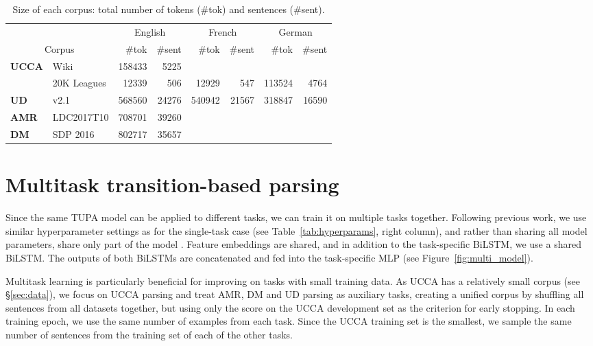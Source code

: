 \documentclass[11pt,a4paper]{article}
\begin{document}
\begin{table*}[ht]
\centering
\begin{tabular}{ll|rr|rr|rr}
& & \multicolumn{2}{c|}{\footnotesize English} & \multicolumn{2}{c|}{\footnotesize French} & \multicolumn{2}{c}{\footnotesize German} \\
\multicolumn{2}{c|}{\footnotesize Corpus} & \footnotesize {\#}tok & \footnotesize {\#}sent & \footnotesize {\#}tok & \footnotesize {\#}sent & \footnotesize {\#}tok & \footnotesize {\#}sent \\
\hline
\textbf{UCCA}
& Wiki & 158433 & 5225 &&&& \\
& 20K Leagues & 12339 & 506 & 12929 & 547 & 113524 & 4764 \\
\hline
\textbf{UD} & v2.1 & 568560 & 24276 & 540942 & 21567 & 318847 & 16590 \\
\hline
\textbf{AMR} & LDC2017T10 & 708701 & 39260 \\
\hline
\textbf{DM} & SDP 2016 & 802717 & 35657 \\
\end{tabular}
\caption{Size of each corpus: total number of tokens ({\#}tok) and sentences
({\#}sent).\label{tab:corpora}}
\end{table*}

\section{Multitask transition-based parsing}\label{sec:multitask}

Since the same TUPA model can be applied to different tasks, we can train it on multiple tasks together.
Following previous work, we use similar hyperparameter settings as for the single-task case
(see Table~\ref{tab:hyperparams}, right column),
and rather than sharing all model parameters, share only part of the model
\cite{P17-1186,N16-1179,P16-2038,C16-1013,C16-1059,C16-1179,E17-1005}.
Feature embeddings are shared, and in addition to the task-specific BiLSTM,
we use a shared BiLSTM.
The outputs of both BiLSTMs are concatenated and
fed into the task-specific MLP (see Figure~\ref{fig:multi_model}).


Multitask learning is particularly beneficial for improving on tasks with small training data.
As UCCA has a relatively small corpus (see \S\ref{sec:data}),
we focus on UCCA parsing and treat AMR, DM and UD parsing
as auxiliary tasks, creating a unified corpus by shuffling all sentences from all datasets together,
but using only the score on the UCCA development set as the criterion for early stopping.
In each training epoch, we use the same number of examples from each task.
Since the UCCA training set is the smallest, we sample the same number of sentences from
the training set of each of the other tasks.
\end{document}
